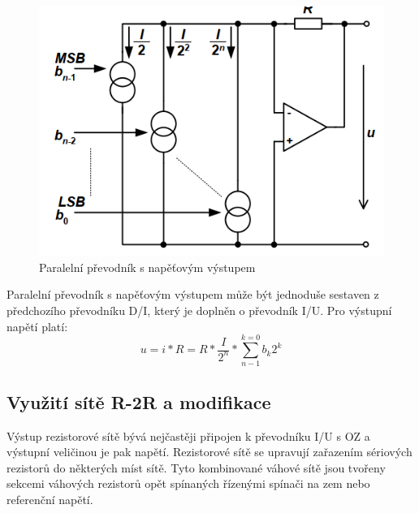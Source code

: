 \begin{figure}[h]
   \begin{center}
     \includegraphics[scale=0.6]{images/DAU.png}
   \end{center}
   \caption{Paralelní převodník s napěťovým výstupem}
\end{figure}

Paralelní převodník s napěťovým výstupem může být jednoduše sestaven z předchozího převodníku D/I, který je doplněn o převodník I/U. Pro výstupní napětí platí:
\begin{equation}
u=i*R=R*\frac{I}{2^n}*\sum_{n-1}^{k=0}b_{k}2^k
\end{equation}


\subsection{Využití sítě R-2R a modifikace}
Výstup rezistorové sítě bývá nejčastěji připojen k převodníku I/U s OZ a výstupní veličinou je pak napětí. Rezistorové sítě se upravují zařazením sériových rezistorů do některých míst sítě. Tyto kombinované váhové sítě jsou tvořeny sekcemi váhových rezistorů opět spínaných řízenými spínači na zem nebo referenční napětí. 
































